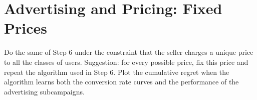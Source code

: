 \chapter{Advertising and Pricing: Fixed Prices}

Do the same of Step 6 under the constraint that the seller charges a unique price to all the classes of users. Suggestion: for every possible price, fix this price and repeat the algorithm used in Step 6. Plot the cumulative regret when the algorithm learns both the conversion rate curves and the performance of the advertising subcampaigns.